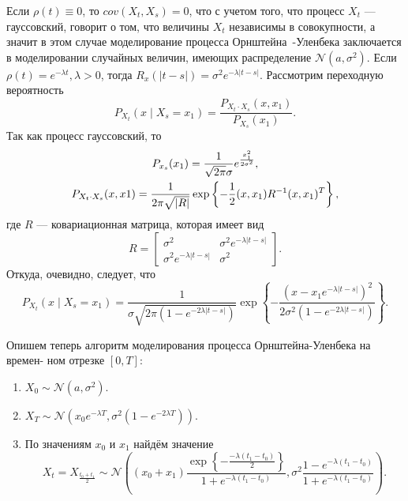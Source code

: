 \documentclass[11pt]{article}
\newcommand\abs[1]{\left\lvert#1\right\rvert}
\begin{document}
Если $\rho(t) \equiv 0$, то $cov(X_t, X_s) = 0$, что с учетом того, что процесс $X_t$ --- гауссовский, говорит о том, что величины $X_t$ независимы в совокупности, а значит в этом случае моделирование процесса Орнштейна~-Уленбека заключается в моделировании случайных величин, имеющих распределение $\mathcal{N}(a, \sigma^2)$. Если $\rho(t) = e^{-\lambda t}, \lambda > 0$, тогда $R_x(\abs{t-s}) = \sigma^2 e^{-\lambda \abs{t-s}}$. Рассмотрим переходную вероятность
$$
P_{X_t} (x \mid X_s = x_1) = \frac{P_{X_t \cdot X_s}(x, x_1)}{P_{X_s}(x_1)}.
$$
Так как процесс гауссовский, то
\begin{gather}
P_{x_s} (x_1) = \frac{1}{\sqrt{2\pi}\sigma} e^{\frac{x_1^2}{2\sigma^2}}, \notag \\
P_{X_t \cdot X_s}(x, x1) = \frac{1}{2\pi\sqrt{\abs{R}}} \exp\left\{ -\frac{1}{2}(x, x_1) R^{-1} (x, x_1)^T \right\}, \notag
\end{gather}
где $R$ — ковариационная матрица, которая имеет вид
$$
R =
\begin{bmatrix}
\sigma^2 & \sigma^2 e^{-\lambda \abs{t-s}} \\
\sigma^2 e^{-\lambda \abs{t-s}} & \sigma^2 
\end{bmatrix}.
$$
Откуда, очевидно, следует, что
$$
P_{X_t}(x \mid X_s = x_1) = \frac{1}{\sigma \sqrt{2\pi\left( 1 - e^{-2\lambda\abs{t-s}} \right)}} \exp \left\{ -\frac{(x - x_1 e^{-\lambda \abs{t-s}})^2}{2\sigma^2 \left( 1 - e^{-2\lambda\abs{t-s}} \right)} \right\}.
$$

Опишем теперь алгоритм моделирования процесса Орнштейна-Уленбека на времен-
ном отрезке $[0, T]$:
\begin{enumerate}
\item $X_0 \sim \mathcal{N}(a, \sigma^2)$.
\item $X_T \sim \mathcal{N}\left(x_0 e^{-\lambda T}, \sigma^2\left( 1 - e^{-2\lambda T} \right)\right)$.
\item По значениям $x_0$ и $x_1$ найдём значение
$$
X_t = X_{\frac{t_0 + t_1}{2}} \sim \mathcal{N}\left( (x_0 + x_1) \frac{\exp\left\{ -\frac{-\lambda(t_1-t_0)}{2} \right\}}{1+e^{-\lambda(t_1-t_0)}}, \sigma^2 \frac{1-e^{-\lambda(t_1-t_0)}}{1+e^{-\lambda(t_1-t_0)}} \right).
$$
\end{enumerate}
\end{document}
